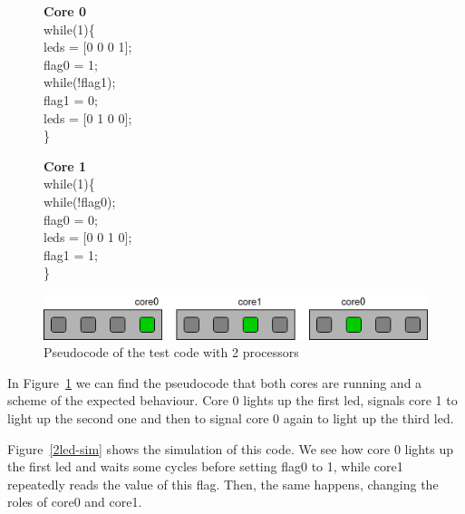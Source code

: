 \begin{figure}[htbp]
\centering
\begin{minipage}[t][4cm][t]{4.5cm}
\textbf{Core 0}\\
while(1)\{\\
\hspace*{1cm}leds = [0 0 0 1];\\
\hspace*{1cm}flag0 = 1;\\
\hspace*{1cm}while(!flag1);\\
\hspace*{1cm}flag1 = 0;\\
\hspace*{1cm}leds = [0 1 0 0];\\
\}
\end{minipage}\hspace{2.5cm}
\begin{minipage}[t][4cm][t]{4.5cm}
\textbf{Core 1}\\
while(1)\{\\
\hspace*{1cm}while(!flag0);\\
\hspace*{1cm}flag0 = 0;\\
\hspace*{1cm}leds = [0 0 1 0];\\
\hspace*{1cm}flag1 = 1;\\
\}
\end{minipage}%
\vspace{.1cm}
\includegraphics[width=.75\textwidth]{images/leds2_fig.png}
\caption{Pseudocode of the test code with 2 processors}
\label{2led-code}
\end{figure}
\clearpage
In Figure~\ref{2led-code} we can find the pseudocode that both cores are running and a scheme of the expected behaviour.
Core 0 lights up the first led, signals core 1 to light up the second one and then to signal core 0 again to light up the third led.

Figure~\ref{2led-sim} shows the simulation of this code.
We see how core 0 lights up the first led and waits some cycles before setting flag0 to 1, while core1 repeatedly reads the value of this flag.
Then, the same happens, changing the roles of core0 and core1.

